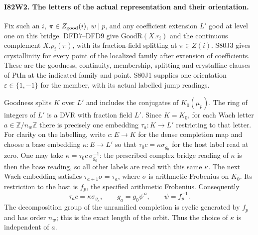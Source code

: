 \paragraph{I82W2. The letters of the actual representation and their orientation.}
Fix such an $i$, $\pi\in Z_{\rm good}(i)$, $w\mid p$, and any
coefficient extension $L'$ good at level one on this bridge.
DFD7--DFD9 give $\mathrm{GoodR}(X.r_i)$ and the continuous
complement $X.\rho_i(\pi)$, with its fraction-field splitting
at $\pi\in Z(i)$. S80J3 gives crystallinity for every point of
the localized family after extension of coefficients. These are the
goodness, continuity, membership, splitting and crystalline clauses of
$\mathrm{PtIn}$ at the indicated family and point. S80J1 supplies
one orientation $\varepsilon\in\{1,-1\}$ for the member, with
its actual labelled jump readings.

Goodness splits $K$ over $L'$ and includes the conjugates of
$K_0(\mu_p)$. The ring of integers of $L'$ is a DVR with fraction
field $L'$. Since $K=K_0$, for each Wach letter
$a\in\mathbb Z/n_w\mathbb Z$ there is precisely one embedding
$\tau_a:K\to L'$ restricting to that letter. For clarity on the
labelling, write $c:E\to K$ for the dense completion map and choose
a base embedding $\kappa:E\to L'$ so that
$\tau_0 c=\kappa\sigma_{g_0}$ for the host label read at zero.
One may take $\kappa=\tau_0 c\,\sigma_{g_0}^{-1}$: the prescribed
complex bridge reading of $\kappa$ is then the base reading, so all
other labels are read with this same $\kappa$. The next Wach
embedding satisfies $\tau_{a+1}\sigma=\tau_a$, where $\sigma$
is arithmetic Frobenius on $K_0$. Its restriction to the host is
$f_p$, the specified arithmetic Frobenius. Consequently
\[
 \tau_a c=\kappa\sigma_{g_a},\qquad
 g_a=g_0\psi^{\,a},\qquad \psi=f_p^{-1}.
\]
The decomposition group of the unramified completion is cyclic
generated by $f_p$ and has order $n_w$; this is the exact length
of the orbit. Thus the choice of $\kappa$ is independent of $a$.

